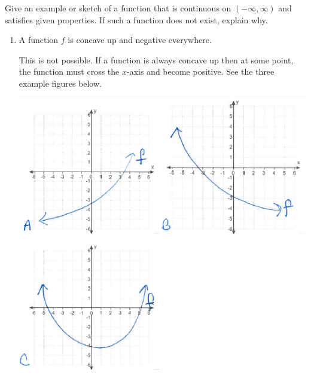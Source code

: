 \documentclass[nooutcomes,handout]{ximera}
\begin{document}
\begin{problem}
Give an example or sketch of a function that is continuous on $(-\infty,\infty)$ and satisfies given properties.  If such a function does not exist, explain why.
\begin{enumerate}
	\item A function $f$ is concave up and negative everywhere.
	\begin{freeResponse}
	This is not possible.  If a function is always concave up then at some point, the function must cross the $x$-axis and become positive.  See the three example figures below.
	      \begin{image}
        \includegraphics[scale = 0.5]{figure8.png}
      \end{image}	
			

\end{freeResponse}
\end{enumerate}
\end{problem}
\end{document}
